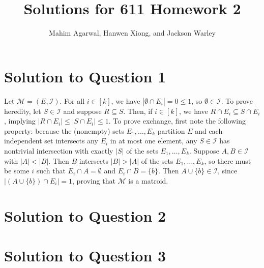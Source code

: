 \documentclass[11pt]{article}
\title{Solutions for 611 Homework 2}
\author{Mahim Agarwal, Hanwen Xiong, and Jackson Warley}
\newcommand{\M}{\mathcal{M}}
\newcommand{\I}{\mathcal{I}}
\begin{document}
\maketitle

\section{Solution to Question 1}

Let $\M = (E, \I)$. For all $i \in [k]$, we have $|\emptyset \cap E_i| = 0 \leq 1$, so $\emptyset \in \I$.
To prove heredity, let $S \in \I$ and suppose $R \subseteq S$.
Then, if $i \in [k]$, we have $R \cap E_i \subseteq S \cap E_i$, implying $|R \cap E_i| \leq |S \cap E_i| \leq 1$.
To prove exchange, first note the following property: because the (nonempty) sets $E_1, \dots, E_k$ partition $E$ and each independent set intersects any $E_i$ in at most one element, any $S \in \I$ has nontrivial intersection with exactly $|S|$ of the sets $E_1, \dots, E_k$.
Suppose $A, B \in \I$ with $|A| < |B|$.
Then $B$ intersects $|B| > |A|$ of the sets $E_1, \dots, E_k$, so there must be some $i$ such that $E_i \cap A = \emptyset$ and $E_i \cap B = \{b\}$.
Then $A \cup \{b\} \in \I$, since $|(A \cup \{b\}) \cap E_i| = 1$, proving that $\M$ is a matroid.

\section{Solution to Question 2}



\section{Solution to Question 3}
\end{document}
